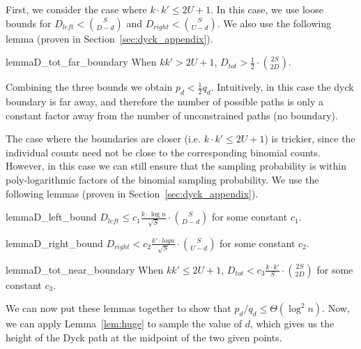 First, we consider the case where $k\cdot k'\le 2U+1$.
In this case, we use loose bounds for $D_{left} < \binom{S}{D-d}$ and $D_{right} < \binom{S}{U-d}$.
We also use the following lemma (proven in Section~\ref{sec:dyck_appendix}).

\begin{restatable}{lemma}{D_tot_far_boundary}
\label{lem:D_tot_far_boundary}
When $kk' > 2U + 1$, $D_{tot} > \frac 12\cdot \binom{2S}{2D}$.
\end{restatable}

Combining the three bounds we obtain $p_d < \frac 12 q_d$.
Intuitively, in this case the dyck boundary is far away, and therefore the number of possible paths
is only a constant factor away from the number of unconstrained paths (no boundary).

The case where the boundaries are closer (i.e. $k\cdot k' \le 2U+1$) is trickier,
since the individual counts need not be close to the corresponding binomial counts.
However, in this case we can still ensure that the sampling probability is within
poly-logarithmic factors of the binomial sampling probability.
We use the following lemmas (proven in Section~\ref{sec:dyck_appendix}).

\begin{restatable}{lemma}{D_left_bound}
\label{lem:D_left_bound}
$D_{left} \le c_1 \frac{ k\cdot\log n}{\sqrt{S}}\cdot{{S}\choose{D-d}}$ for some constant $c_1$.
\end{restatable}

\begin{restatable}{lemma}{D_right_bound}
\label{lem:D_right_bound}
$D_{right} < c_2 \frac{k'\cdot log n}{\sqrt{S}}\cdot{{S}\choose{U-d}}$ for some constant $c_2$.
\end{restatable}

\begin{restatable}{lemma}{D_tot_near_boundary}
\label{lem:D_tot_near_boundary}
When $kk' \le 2U + 1$, $D_{tot} < c_3 \frac{k\cdot k'}{S}\cdot{{2S}\choose{2D}}$ for some constant $c_3$.
\end{restatable}

We can now put these lemmas together to show that $p_d/q_d \le \Theta(\log^2 n)$.
Now, we can apply Lemma~\ref{lem:huge} to sample the value of $d$,
which gives us the height of the Dyck path at the midpoint of the two given points.

